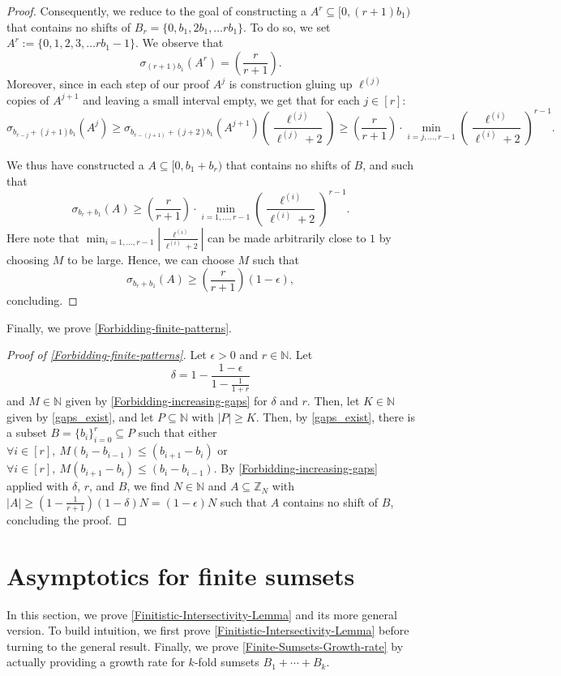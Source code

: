 \documentclass[letter, 11pt]{article}
\theoremstyle{plain} %
\theoremstyle{definition} %
\theoremstyle{plain}
\theoremstyle{plain}
\newcommand{\N}{\mathbb{N}}
\newcommand{\Z}{\mathbb{Z}}
\newcommand{\1}{\mathbbm{1}}
\begin{document}
\begin{proof}
    Consequently, we reduce to the goal of constructing a $A^{r} \subseteq [0, (r+1)b_1 ) $ that contains no shifts of $B_{r}=\{0, b_1, 2b_1, \ldots rb_1\}$. To do so, we set $A^r:=\{0, 1,2,3, \ldots rb_1 -1 \}$. We observe that 
    $$\sigma_{(r+1)b_1}(A^r)= \left( \frac{r}{r+1}\right). $$
    Moreover, since in each step of our proof $A^j$ is construction gluing up $\ell^{(j)}$ copies of $A^{j+1}$ and leaving a small interval empty, we get that for each $j\in [r]:$
    $$ \sigma_{b_{r-j} + (j+1)b_1}(A^j) \geq \sigma_{b_{r-(j+1)} + (j+2)b_1}(A^{j+1}) \left(\frac{\ell^{(j)}}{\ell^{(j)}+2}\right) \geq \left(\frac{r}{r+1}\right)\cdot \min_{i=j,\ldots,r-1}  \left(\frac{\ell^{(i)}}{\ell^{(i)}+2}\right)^{r-1}.$$
    
    We thus have constructed a $A \subseteq [0,b_1 + b_r )$ that contains no shifts of $B$, and such that
        \[\sigma_{b_r + b_1}(A) \geq \left(\frac{r}{r+1}\right)\cdot \min_{i=1,\ldots,r-1}  \left(\frac{\ell^{(i)}}{\ell^{(i)}+2}\right)^{r-1}.\]
    Here note that $\min_{i=1,\ldots,r-1}|\frac{\ell^{(i)}}{\ell^{(i)}+2}|$ can be made arbitrarily close to $1$ by choosing $M$ to be large. Hence, we can choose $M$ such that $$\sigma_{b_r + b_1}(A) \geq \left(\frac{r}{r+1}\right) (1 - \epsilon) ,$$
    concluding.
\end{proof}

Finally, we prove \cref{Forbidding-finite-patterns}.
\begin{proof}[Proof of \cref{Forbidding-finite-patterns}]
    Let $\epsilon>0$ and $r\in\N$. Let $$\delta= 1- \frac{1-\epsilon}{1-\frac{1}{1+r}}$$ and $M\in \N$ given by \cref{Forbidding-increasing-gaps} for $\delta$ and $r$. Then, let $K\in \N$ given by \cref{gaps_exist}, and let $P\subseteq\N$ with $|P|\geq K$. Then, by \cref{gaps_exist}, there is a subset $B=\{b_i\}_{i=0}^r\subseteq P$ such that either $\forall i\in [r], \ M(b_{i}-b_{i-1}) \leq (b_{i+1}-b_i) $ or $\forall i\in [r], \ M(b_{i+1}-b_i) \leq (b_{i}-b_{i-1})$. By \cref{Forbidding-increasing-gaps} applied with $\delta$, $r$, and $B$, we find $N\in \N$ and $A\subseteq \Z_N$ with $|A|\geq (1-\frac{1}{r+1})(1-\delta)N=(1-\epsilon)N$ such that $A$ contains no shift of $B$, concluding the proof.
    \end{proof}











\section{Asymptotics for finite sumsets}\label{sec3}
In this section, we prove \cref{Finitistic-Intersectivity-Lemma} and its more general version. To build intuition, we first prove \cref{Finitistic-Intersectivity-Lemma} before turning to the general result. Finally, we prove \cref{Finite-Sumsets-Growth-rate} by actually providing a growth rate for $k$-fold sumsets $B_1+\cdots+B_k$.
\end{document}
